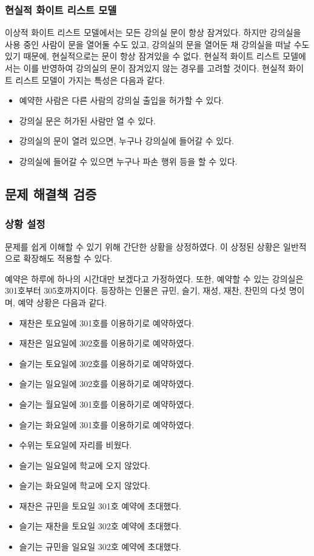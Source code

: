 \documentclass[11pt,a4paper]{article}
\begin{document}
\subsubsection{현실적 화이트 리스트 모델}
이상적 화이트 리스트 모델에서는 모든 강의실 문이 항상 잠겨있다. 하지만
강의실을 사용 중인 사람이 문을 열어둘 수도 있고, 강의실의 문을 열어둔 채
강의실을 떠날 수도 있기 때문에, 현실적으로는 문이 항상 잠겨있을 수 없다.
현실적 화이트 리스트 모델에서는 이를 반영하여 강의실의 문이 잠겨있지 않는
경우를 고려할 것이다. 현실적 화이트 리스트 모델이 가지는 특성은 다음과 같다.
\begin{itemize}
\item 예약한 사람은 다른 사람의 강의실 출입을 허가할 수 있다.
\item 강의실 문은 허가된 사람만 열 수 있다.
\item 강의실의 문이 열려 있으면, 누구나 강의실에 들어갈 수 있다.
\item 강의실에 들어갈 수 있으면 누구나 파손 행위 등을 할 수 있다.
\end{itemize}

\subsection{문제 해결책 검증}

\subsubsection{상황 설정}
문제를 쉽게 이해할 수 있기 위해 간단한 상황을 상정하였다. 이 상정된 상황은
일반적으로 확장해도 적용할 수 있다.

예약은 하루에 하나의 시간대만 보겠다고 가정하였다. 또한, 예약할 수 있는
강의실은 301호부터 305호까지이다. 등장하는 인물은 규민, 슬기, 재성, 재찬,
찬민의 다섯 명이며, 예약 상황은 다음과 같다.

\begin{itemize}
\item 재찬은 토요일에 301호를 이용하기로 예약하였다.
\item 재찬은 일요일에 302호를 이용하기로 예약하였다.
\item 슬기는 토요일에 302호를 이용하기로 예약하였다.
\item 슬기는 일요일에 302호를 이용하기로 예약하였다.
\item 슬기는 월요일에 301호를 이용하기로 예약하였다.
\item 슬기는 화요일에 301호를 이용하기로 예약하였다.
\item 수위는 토요일에 자리를 비웠다.
\item 슬기는 일요일에 학교에 오지 않았다.
\item 슬기는 화요일에 학교에 오지 않았다.
\item 재찬은 규민을 토요일 301호 예약에 초대했다.
\item 슬기는 재찬을 토요일 302호 예약에 초대했다.
\item 슬기는 규민을 일요일 302호 예약에 초대했다.
\end{itemize}
\end{document}
